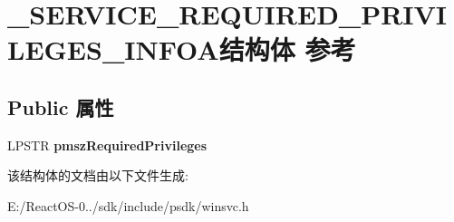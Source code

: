 \hypertarget{struct___s_e_r_v_i_c_e___r_e_q_u_i_r_e_d___p_r_i_v_i_l_e_g_e_s___i_n_f_o_a}{}\section{\+\_\+\+S\+E\+R\+V\+I\+C\+E\+\_\+\+R\+E\+Q\+U\+I\+R\+E\+D\+\_\+\+P\+R\+I\+V\+I\+L\+E\+G\+E\+S\+\_\+\+I\+N\+F\+O\+A结构体 参考}
\label{struct___s_e_r_v_i_c_e___r_e_q_u_i_r_e_d___p_r_i_v_i_l_e_g_e_s___i_n_f_o_a}
\subsection*{Public 属性}
\begin{DoxyCompactItemize}
\item 
\mbox{\label{struct___s_e_r_v_i_c_e___r_e_q_u_i_r_e_d___p_r_i_v_i_l_e_g_e_s___i_n_f_o_a_a04f827606a2d432b7ae78878603e8eb8}} 
L\+P\+S\+TR {\bfseries pmsz\+Required\+Privileges}
\end{DoxyCompactItemize}


该结构体的文档由以下文件生成\+:\begin{DoxyCompactItemize}
\item 
E\+:/\+React\+O\+S-\/0../sdk/include/psdk/winsvc.\+h\end{DoxyCompactItemize}

